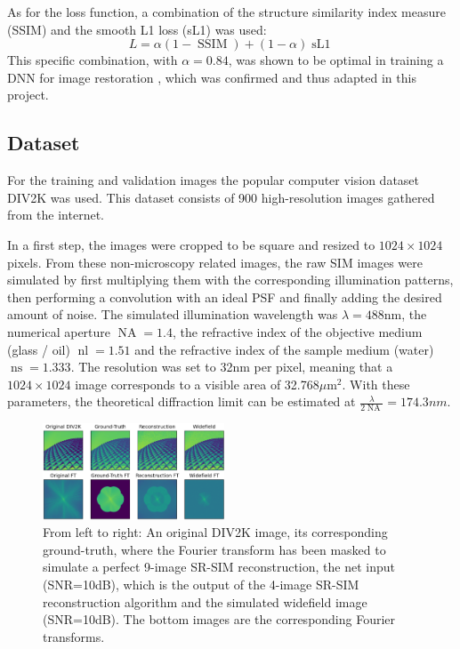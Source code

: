 \documentclass[conference]{IEEEtran}
\begin{document}
As for the loss function, a combination of the structure similarity index measure (SSIM) \cite{ssim_article} and the smooth L1 loss (sL1) was used:
$$L=\alpha(1-\operatorname{SSIM})+(1-\alpha)\operatorname{sL1}$$
This specific combination, with $\alpha=0.84$, was shown to be optimal in training a DNN for image restoration \cite{loss_func_comp_paper}, which was confirmed and thus adapted in this project.

\subsection{Dataset}
\label{sec:Dataset}
For the training and validation images the popular computer vision dataset DIV2K \cite{Agustsson_2017_CVPR_Workshops, Timofte_2017_CVPR_Workshops, Ignatov_2018_ECCV_Workshops} was used. This dataset consists of 900 high-resolution images gathered from the internet.

In a first step, the images were cropped to be square and resized to $1024\times 1024$ pixels. From these non-microscopy related images, the raw SIM images were simulated by first multiplying them with the corresponding illumination patterns, then performing a convolution with an ideal PSF and finally adding the desired amount of noise. The simulated illumination wavelength was $\lambda=488$nm, the numerical aperture $\operatorname{NA}=1.4$, the refractive index of the objective medium (glass / oil) $\operatorname{nl}=1.51$ and the refractive index of the sample medium (water) $\operatorname{ns}=1.333$. The resolution was set to 32nm per pixel, meaning that a $1024 \times 1024$ image corresponds to a visible area of 32.768$\mu$m$^2$. With these parameters, the theoretical diffraction limit can be estimated at $\frac{\lambda}{2\operatorname{NA}}=174.3nm$.

\begin{figure}[h]
    \centering
    \includegraphics[width=0.48\textwidth]{images/images_and_FTs.png}
    \caption{From left to right: An original DIV2K image, its corresponding ground-truth, where the Fourier transform has been masked to simulate a perfect 9-image SR-SIM reconstruction, the net input (SNR=10dB), which is the output of the 4-image SR-SIM reconstruction algorithm and the simulated widefield image (SNR=10dB). The bottom images are the corresponding Fourier transforms.}
    \label{fig:images_and_FTs}
\end{figure}
\end{document}
